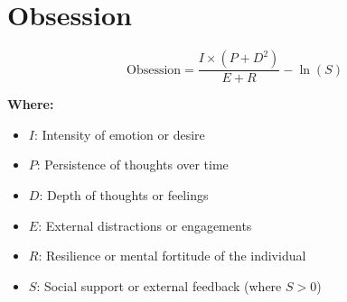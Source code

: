\chapter{Obsession}

\begin{equation}
\text{Obsession} = \frac{I \times (P + D^2)}{E + R} - \ln{(S)}
\end{equation}

\textbf{Where:}

\begin{itemize}
    \item $I$: Intensity of emotion or desire
    \item $P$: Persistence of thoughts over time
    \item $D$: Depth of thoughts or feelings
    \item $E$: External distractions or engagements
    \item $R$: Resilience or mental fortitude of the individual
    \item $S$: Social support or external feedback (where $S > 0$)
\end{itemize}